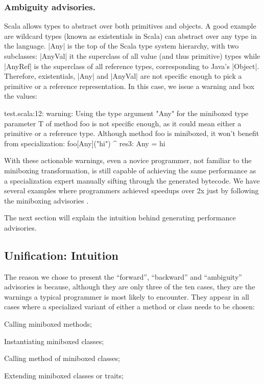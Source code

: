 \subsubsection{Ambiguity advisories.} Scala allows types to abstract over both primitives and objects. A good example are wildcard types (known as existentials in Scala) can abstract over any type in the language. |Any| is the top of the Scala type system hierarchy, with two subclasses: |AnyVal| it the superclass of all value (and thus primitive) types while |AnyRef| is the superclass of all reference types, corresponding to Java's |Object|. Therefore, existentials, |Any| and |AnyVal| are not specific enough to pick a primitive or a reference representation. In this case, we issue a warning and box the values:

\begin{lstlisting-nobreak-nolang}
test.scala:12: warning: Using the type argument "Any" for the miniboxed type parameter T of method foo is not specific enough, as it could mean either a primitive or a reference type. Although method foo is miniboxed, it won't benefit from specialization:
              foo[Any]("hi")
                   ^
res3: Any = hi
\end{lstlisting-nobreak-nolang}

With these actionable warnings, even a novice programmer, not familiar to the miniboxing transformation, is still capable of achieving the same performance as a specialization expert manually sifting through the generated bytecode. We have several examples where programmers achieved speedups over 2x just by following the miniboxing advisories \cite{miniboxing-www,tixxit-respecialization6,pnwscala-pureimage}.

The next section will explain the intuition behind generating performance advisories.

\subsection{Unification: Intuition}

The reason we chose to present the ``forward'', ``backward'' and ``ambiguity'' advisories is because, although they are only three of the ten cases, they are the warnings a typical programmer is most likely to encounter. They appear in all cases where a specialized variant of either a method or class needs to be chosen:

\begin{compactitem}
 \item Calling miniboxed methods;
 \item Instantiating miniboxed classes;
 \item Calling method of miniboxed classes;
 \item Extending miniboxed classes or traits;
\end{compactitem}

